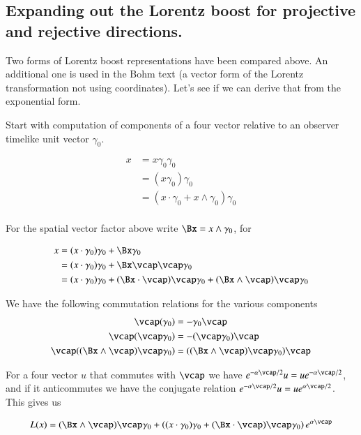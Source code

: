 \documentclass{article}
\begin{document}
\subsection{ Expanding out the Lorentz boost for projective and rejective directions. }

Two forms of Lorentz boost representations have been compared above.  An additional one is used in the Bohm text (a 
vector form of the Lorentz transformation not using coordinates).  Let's see
if we can derive that from the exponential form.

Start with computation of components of a four vector relative to an observer timelike unit vector $\gamma_0$.

\begin{align*}
x 
&= x \gamma_0 \gamma_0 \\
&= (x \gamma_0) \gamma_0 \\
&= (x \cdot \gamma_0 + x \wedge \gamma_0) \gamma_0 \\
\end{align*}

For the spatial vector factor above write $\Bx = x \wedge \gamma_0$, for

\begin{align*}
x 
&= (x \cdot \gamma_0) \gamma_0 + \Bx \gamma_0 \\
&= (x \cdot \gamma_0) \gamma_0 + \Bx \vcap \vcap \gamma_0 \\
&= (x \cdot \gamma_0) \gamma_0 + (\Bx \cdot \vcap) \vcap \gamma_0 + (\Bx \wedge \vcap) \vcap \gamma_0 \\
\end{align*}

We have the following commutation relations for the various components
\begin{align*}
\vcap (\gamma_0) &= - \gamma_0 \vcap \\
\vcap (\vcap \gamma_0) &= - (\vcap \gamma_0) \vcap \\
\vcap ((\Bx \wedge \vcap) \vcap \gamma_0 ) 
&= ((\Bx \wedge \vcap) \vcap \gamma_0) \vcap
\end{align*}

For a four vector $u$ that commutes with $\vcap$ we have $e^{-\alpha \vcap/2} u = u e^{-\alpha \vcap/2}$, and if it anticommutes
we have the conjugate relation
$e^{-\alpha \vcap/2} u = u e^{\alpha \vcap/2}$.  This gives us

\begin{align*}
L(x) 
&= 
(\Bx \wedge \vcap) \vcap \gamma_0 +
\left( (x \cdot \gamma_0) \gamma_0 + (\Bx \cdot \vcap) \vcap \gamma_0 \right) e^{\alpha \vcap} \\
\end{align*}
\end{document}
